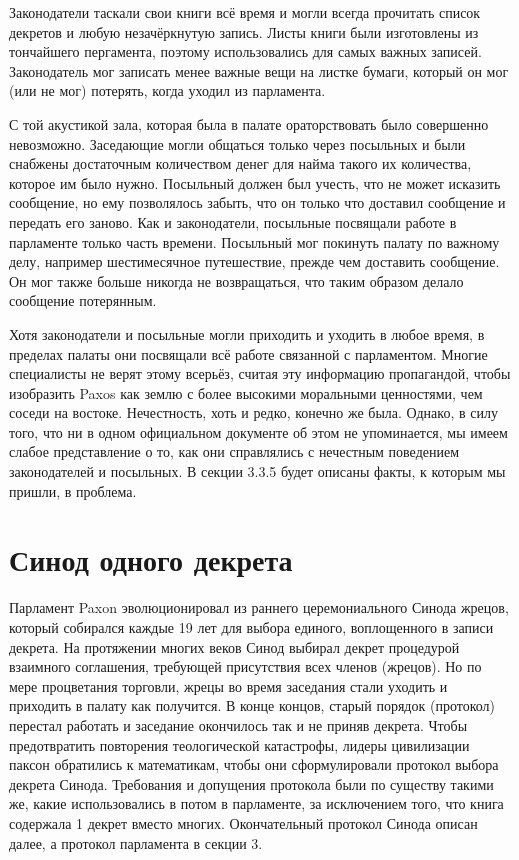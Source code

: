 \documentclass[12pt, a4paper]{article} %
\begin{document}
Законодатели таскали свои книги всё время и могли всегда прочитать список декретов и любую незачёркнутую запись. Листы книги были изготовлены из тончайшего пергамента, поэтому использовались для самых важных записей. Законодатель мог записать менее важные вещи на листке бумаги, который он мог (или не мог) потерять, когда уходил из парламента.

С той акустикой зала, которая была в палате ораторствовать было совершенно невозможно. Заседающие могли общаться только через посыльных и были снабжены достаточным количеством денег для найма такого их количества, которое им было нужно. Посыльный должен был учесть, что не может исказить сообщение, но ему позволялось забыть, что он только что доставил сообщение и передать его заново. Как и законодатели, посыльные посвящали работе в парламенте только часть времени. Посыльный мог покинуть палату по важному делу, например шестимесячное путешествие, прежде чем доставить сообщение. Он мог также больше никогда не возвращаться, что таким образом делало сообщение потерянным.

Хотя законодатели и посыльные могли приходить и уходить в любое время, в пределах палаты они посвящали всё работе связанной с парламентом. Многие специалисты не верят этому всерьёз, считая эту информацию пропагандой, чтобы изобразить Paxos как землю с более высокими моральными ценностями, чем соседи на востоке. Нечестность, хоть и редко, конечно же была. Однако, в силу того, что ни в одном официальном документе об этом не упоминается, мы имеем слабое представление о то, как они справлялись с нечестным поведением законодателей и посыльных. В секции 3.3.5 будет описаны факты, к которым мы пришли, в проблема.

\section{Синод одного декрета}

Парламент Paxon эволюционировал из раннего церемониального Синода жрецов, который собирался каждые 19 лет для выбора единого, воплощенного в записи декрета. На протяжении многих веков Синод выбирал декрет процедурой взаимного соглашения, требующей присутствия всех членов (жрецов). Но по мере процветания торговли, жрецы во время заседания стали уходить и приходить в палату как получится. В конце концов, старый порядок (протокол) перестал работать и заседание окончилось так и не приняв декрета. Чтобы предотвратить повторения теологической катастрофы, лидеры цивилизации паксон обратились к математикам, чтобы они сформулировали протокол выбора декрета Синода. Требования и допущения протокола были по существу такими же, какие использовались в потом в парламенте, за исключением того, что книга содержала 1 декрет вместо многих. Окончательный протокол Синода описан далее, а протокол парламента в секции 3.
\end{document}
